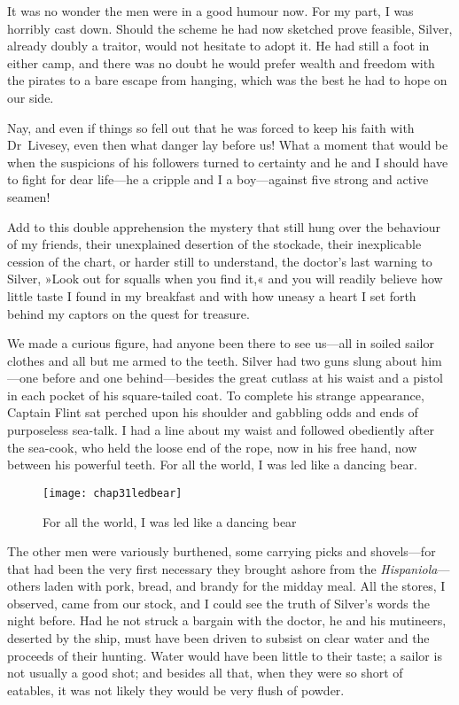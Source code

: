 It was no wonder the men were in a good humour now. For my part, I was horribly cast down. Should the scheme he had now sketched prove feasible, Silver, already doubly a traitor, would not hesitate to adopt it. He had still a foot in either camp, and there was no doubt he would prefer wealth and freedom with the pirates to a bare escape from hanging, which was the best he had to hope on our side.

Nay, and even if things so fell out that he was forced to keep his faith with Dr~Livesey, even then what danger lay before us! What a moment that would be when the suspicions of his followers turned to certainty and he and I should have to fight for dear life—he a cripple and I a boy—against five strong and active seamen!

Add to this double apprehension the mystery that still hung over the behaviour of my friends, their unexplained desertion of the stockade, their inexplicable cession of the chart, or harder still to understand, the doctor's last warning to Silver, »Look out for squalls when you find it,« and you will readily believe how little taste I found in my breakfast and with how uneasy a heart I set forth behind my captors on the quest for treasure.

We made a curious figure, had anyone been there to see us—all in soiled sailor clothes and all but me armed to the teeth. Silver had two guns slung about him—one before and one behind—besides the great cutlass at his waist and a pistol in each pocket of his square-tailed coat. To complete his strange appearance, Captain Flint sat perched upon his shoulder and gabbling odds and ends of purposeless sea-talk. I had a line about my waist and followed obediently after the sea-cook, who held the loose end of the rope, now in his free hand, now between his powerful teeth. For all the world, I was led like a dancing bear.

\begin{sidewaysfigure}
\texttt{[image: chap31ledbear]}%
\caption{For all the world, I was led like a dancing bear}
\end{sidewaysfigure} 

The other men were variously burthened, some carrying picks and shovels—for that had been the very first necessary they brought ashore from the \textit{Hispaniola}—others laden with pork, bread, and brandy for the midday meal. All the stores, I observed, came from our stock, and I could see the truth of Silver's words the night before. Had he not struck a bargain with the doctor, he and his mutineers, deserted by the ship, must have been driven to subsist on clear water and the proceeds of their hunting. Water would have been little to their taste; a sailor is not usually a good shot; and besides all that, when they were so short of eatables, it was not likely they would be very flush of powder.

